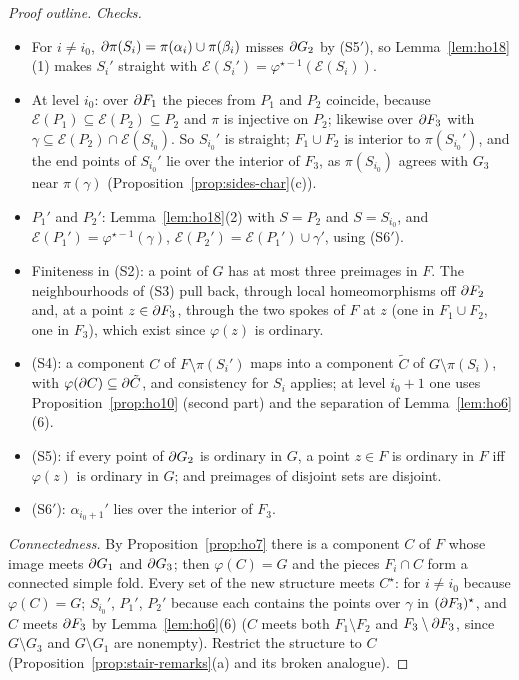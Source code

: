 \begin{proof}[Proof outline]
\emph{Checks.}
\begin{itemize}
\item For $i\neq i_0$, $\partial\pi(S_i)=\pi(\alpha_i)\cup\pi(\beta_i)$ misses $\partial G_2$ by (S5$'$), so Lemma~\ref{lem:ho18}(1) makes $S_i'$ straight with $\mathcal E(S_i')=\varphi^{\star-1}(\mathcal E(S_i))$.
\item At level $i_0$: over $\partial F_1$ the pieces from $P_1$ and $P_2$ coincide, because $\mathcal E(P_1)\subseteq\mathcal E(P_2)\subseteq P_2$ and $\pi$ is injective on $P_2$; likewise over $\partial F_3$
with $\gamma\subseteq\mathcal E(P_2)\cap\mathcal E(S_{i_0})$. So $S_{i_0}'$ is straight; $F_1\cup F_2$ is interior to $\pi(S_{i_0}')$, and the end points of $S_{i_0}'$ lie over the interior of $F_3$, as
$\pi(S_{i_0})$ agrees with $G_3$ near $\pi(\gamma)$ (Proposition~\ref{prop:sides-char}(c)).
\item $P_1'$ and $P_2'$: Lemma~\ref{lem:ho18}(2) with $S=P_2$ and $S=S_{i_0}$, and $\mathcal E(P_1')=\varphi^{\star-1}(\gamma)$, $\mathcal E(P_2')=\mathcal E(P_1')\cup\gamma'$, using (S6$'$).
\item Finiteness in (S2): a point of $G$ has at most three preimages in $F$. The neighbourhoods of (S3) pull back, through local homeomorphisms off $\partial F_2$ and, at a point
$z\in\partial F_3$, through the two spokes of $F$ at $z$ (one in $F_1\cup F_2$, one in $F_3$), which exist since $\varphi(z)$ is ordinary.
\item (S4): a component $C$ of $F\setminus\pi(S_i')$ maps into a component $\tilde C$ of $G\setminus\pi(S_i)$, with $\varphi(\partial C)\subseteq\partial\tilde C$, and consistency for $S_i$ applies; at
level $i_0+1$ one uses Proposition~\ref{prop:ho10} (second part) and the separation of Lemma~\ref{lem:ho6}(6).
\item (S5): if every point of $\partial G_2$ is ordinary in $G$, a point $z\in F$ is ordinary in $F$ iff $\varphi(z)$ is ordinary in $G$; and preimages of disjoint sets are disjoint.
\item (S6$'$): $\alpha_{i_0+1}'$ lies over the interior of $F_3$.
\end{itemize}

\emph{Connectedness.} By Proposition~\ref{prop:ho7} there is a component $C$ of $F$ whose image meets $\partial G_1$ and $\partial G_3$; then $\varphi(C)=G$ and the pieces $F_i\cap C$ form a
connected simple fold. Every set of the new structure meets $C^\star$: for $i\neq i_0$ because $\varphi(C)=G$; $S_{i_0}'$, $P_1'$, $P_2'$ because each contains the points over
$\gamma$ in $(\partial F_3)^\star$, and $C$ meets $\partial F_3$ by Lemma~\ref{lem:ho6}(6) ($C$ meets both $F_1\setminus F_2$ and $F_3\setminus\partial F_3$, since $G\setminus G_3$ and $G\setminus G_1$ are nonempty).
Restrict the structure to $C$ (Proposition~\ref{prop:stair-remarks}(a) and its broken analogue).
\end{proof}

